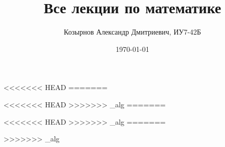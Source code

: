 
\usepackage{newclude}

\title{Все лекции по математике}
\author{Козырнов Александр Дмитриевич, ИУ7-42Б}
\date{\today}


\tableofcontents










<<<<<<< HEAD
=======

<<<<<<< HEAD
>>>>>>> _alg
=======

<<<<<<< HEAD
>>>>>>> _alg
=======

>>>>>>> _alg

